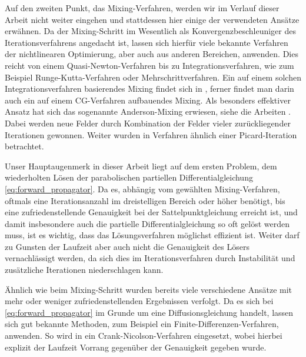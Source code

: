 \documentclass[../main.tex]{subfiles}
\begin{document}
%
Auf den zweiten Punkt, das Mixing-Verfahren, werden wir im Verlauf dieser Arbeit nicht weiter eingehen und stattdessen hier einige der verwendeten Ansätze erwähnen.
Da der Mixing-Schritt im Wesentlich als Konvergenzbeschleuniger des Iterationsverfahrens angedacht ist, lassen sich hierfür viele bekannte Verfahren der nichtlinearen Optimierung, aber auch aus anderen Bereichen, anwenden.
Dies reicht von einem Quasi-Newton-Verfahren \cite{Matsen:1994bz} bis zu Integrationsverfahren, wie zum Beispiel Runge-Kutta-Verfahren oder Mehrschrittverfahren.
Ein auf einem solchen Integrationsverfahren basierendes Mixing findet sich in \cite{Ceniceros:2006is}, ferner findet man darin auch ein auf einem CG-Verfahren aufbauendes Mixing.
Als besonders effektiver Ansatz hat sich das sogenannte Anderson-Mixing erwiesen, siehe die Arbeiten \cite{Thompson:2004um,Stasiak:2011ba}.
Dabei werden neue Felder durch Kombination der Felder vieler zurückliegender Iterationen gewonnen.
Weiter wurden in \cite{Drolet:1999bs} Verfahren ähnlich einer Picard-Iteration betrachtet.

Unser Hauptaugenmerk in dieser Arbeit liegt auf dem ersten Problem, dem wiederholten Lösen der parabolischen partiellen Differentialgleichung \cref{eq:forward_propagator}.
Da es, abhängig vom gewählten Mixing-Verfahren, oftmals eine Iterationsanzahl im dreistelligen Bereich oder höher benötigt, bis eine zufriedenstellende Genauigkeit bei der Sattelpunktgleichung erreicht ist, und damit insbesondere auch die partielle Differentialgleichung so oft gelöst werden muss, ist es wichtig, dass das Lösungsverfahren möglichst effizient ist.
Weiter darf zu Gunsten der Laufzeit aber auch nicht die Genauigkeit des Lösers vernachlässigt werden, da sich dies im Iterationsverfahren durch Instabilität und zusätzliche Iterationen niederschlagen kann.

Ähnlich wie beim Mixing-Schritt wurden bereits viele verschiedene Ansätze mit mehr oder weniger zufriedenstellenden Ergebnissen verfolgt.
Da es sich bei \cref{eq:forward_propagator} im Grunde um eine Diffusionsgleichung handelt, lassen sich gut bekannte Methoden, zum Beispiel ein Finite-Differenzen-Verfahren, anwenden.
So wird in \cite{Drolet:1999bs} ein Crank-Nicolson-Verfahren eingesetzt, wobei hierbei explizit der Laufzeit Vorrang gegenüber der Genauigkeit gegeben wurde.
\end{document}
